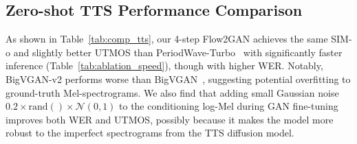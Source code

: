 \begin{table}[h!]
\centering
\caption{Model generation speed comparison with batch size of 16 and length of 1 second. BigVGAN-v2$^*$ use the specialized CUDA kernel. }
\vspace{-0.5em}
\label{tab:ablation_speed}
\setlength{\tabcolsep}{6pt} %
\vspace{-0.5em}
\end{table}


\subsection{Zero-shot TTS Performance Comparison}
\label{ssec:comp_tts}


As shown in Table~\ref{tab:comp_tts}, our 4-step Flow2GAN achieves the same SIM-o and slightly better UTMOS than PeriodWave-Turbo~\citep{periodwave_turbo} with significantly faster inference (Table~\ref{tab:ablation_speed}), though with higher WER.
Notably, BigVGAN-v2 performs worse than BigVGAN~\citep{bigvgan}, suggesting potential overfitting to ground-truth Mel-spectrograms. We also find that adding small Gaussian noise $0.2 \times \text{rand}() \times \mathcal{N}(0, 1)$ to the conditioning log-Mel during GAN fine-tuning improves both WER and UTMOS, possibly because it makes the model more robust to the imperfect spectrograms from the TTS diffusion model.


